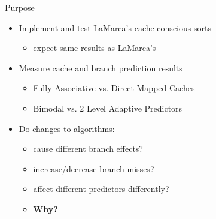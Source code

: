 \begin{slide}

\begin{stitle}
Purpose
\end{stitle}

\begin{itemize}
\item Implement and test LaMarca's cache-conscious sorts
\begin{itemize}
\item expect same results as LaMarca's
\end{itemize}
\item Measure cache and branch prediction results
\begin{itemize}
\item Fully Associative vs. Direct Mapped Caches
\item Bimodal vs. 2 Level Adaptive Predictors
\end{itemize}
\item Do changes to algorithms:
\begin{itemize}
\item cause different branch effects?
\item increase/decrease branch misses?
\item affect different predictors differently?
\item \bfseries{Why?}
\end{itemize}
\end{itemize}

\end{slide}
